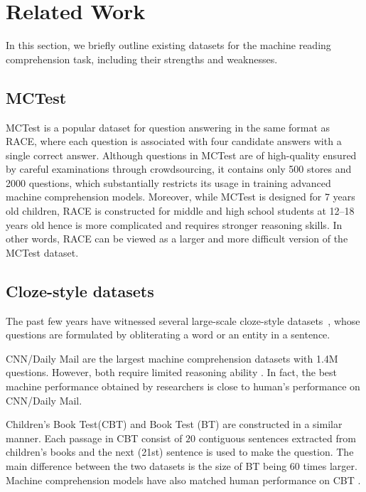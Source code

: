 \section{Related Work}
\label{sec:related}
In this section, we briefly outline existing datasets for the machine reading comprehension task, including their strengths and weaknesses.

\subsection{MCTest}

MCTest \cite{richardson2013mctest} is a popular dataset for question answering in the same format as RACE, where each question is associated with four candidate answers with a single correct answer. Although questions in MCTest are of high-quality ensured by careful examinations through crowdsourcing, it contains only 500 stores and 2000 questions, which substantially restricts its usage in training advanced machine comprehension models. Moreover, while MCTest is designed for 7 years old children, RACE is constructed for middle and high school students at 12--18 years old hence is more complicated and requires stronger reasoning skills. In other words, RACE can be viewed as a larger and more difficult version of the MCTest dataset.

\subsection{Cloze-style datasets} The past few years have witnessed several large-scale cloze-style datasets~\citep{hermann2015teaching, hill2015goldilocks, bajgar2016embracing, onishi2016did}, whose questions are formulated by obliterating a word or an entity in a sentence. 

{ CNN/Daily Mail} \cite{hermann2015teaching} are the largest machine comprehension datasets with 1.4M questions. However, both require limited reasoning ability \cite{chen2016thorough}. In fact, the best machine performance obtained by researchers \cite{chen2016thorough,dhingra2016gated} is close to human's performance on { CNN/Daily Mail}. 

{ Children’s Book Test}(CBT) \cite{hill2015goldilocks} and { Book Test} (BT) \cite{bajgar2016embracing} are constructed in a similar manner. Each passage in CBT consist of $20$ contiguous sentences extracted from children's books and the next (21st) sentence is used to make the question. The main difference between the two datasets is the size of BT being $60$ times larger. Machine comprehension models have also matched human performance on CBT \cite{bajgar2016embracing}.

